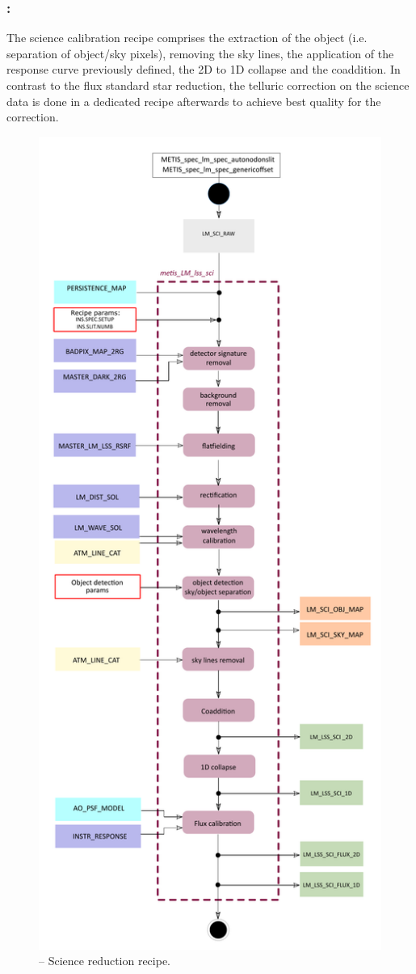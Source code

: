 \subsubsection{:}
The science calibration recipe comprises the extraction of the object (i.e. separation of object/sky pixels), removing the sky lines, the application of the response curve previously defined, the 2D to 1D collapse and the coaddition. In contrast to the flux standard star reduction, the telluric correction on the science data is done in a dedicated recipe afterwards to achieve best quality for the correction.
\begin{figure}[ht]
  \centering
  \includegraphics[width=0.4\textheight]{figures/metis_lm_lss_sci_v0.65.pdf}
  \caption[Recipe: ]{ --
    Science reduction recipe.}
  \label{Fig:rec_lm_lss_sci}
\end{figure}
\clearpage


